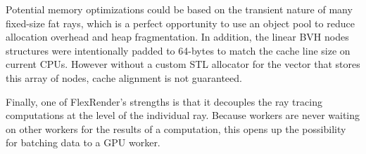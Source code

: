 \documentclass[a4paper,twoside]{article}
\begin{document}
Potential memory optimizations could be based on the transient
nature of many fixed-size fat rays, which is a perfect opportunity to use an object
pool to reduce allocation overhead and heap fragmentation.
In addition, the linear BVH nodes structures were intentionally padded to
64-bytes to match the cache line size on current CPUs. However without a custom
STL allocator for the vector that stores this array of nodes, cache alignment
is not guaranteed. 

Finally, one of FlexRender's strengths is that it decouples the ray tracing computations
at the level of the individual ray. Because workers are never waiting on other workers for the results of a computation, this opens up the possibility for batching data to a GPU worker.


{\small
}

\vfill
\end{document}
